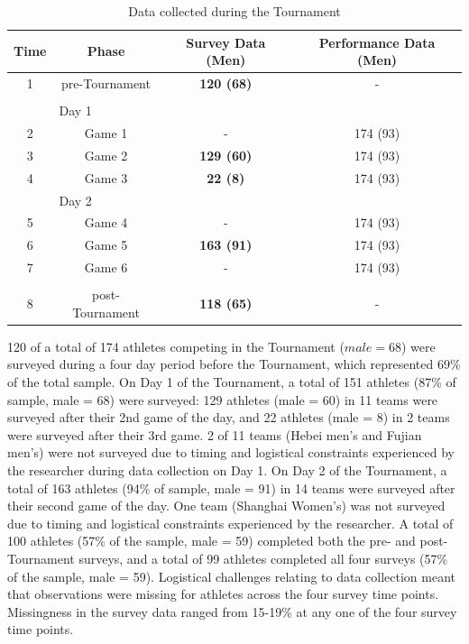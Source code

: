       \begin{table}[htbp]\caption{Data collected during the Tournament}
        \begin{center}
          \begin{small}
            \begin{tabular}{c|c c c}
                \bf Time & \bf Phase & \bf Survey Data (Men) & \bf Performance Data (Men) \\
                \hline
                1 & pre-Tournament & \bf 120 (68) & - \\
                & & & \\
                & \multicolumn{1}{l}{Day 1} & & \\
                2 & Game 1 & - & 174 (93) \\
                3 & Game 2 & \bf129 (60) & 174 (93) \\
                4 & Game 3 & \bf22 (8) & 174 (93) \\
                & \multicolumn{1}{l}{Day 2} & & \\
                5 & Game 4 & - & 174 (93) \\
                6 & Game 5 & \bf 163 (91) & 174 (93) \\
                7 & Game 6 & - & 174 (93) \\
                & & & \\
                8 & post-Tournament & \bf118 (65) & - \\
            \end{tabular}
          \end{small}
        \end{center}
        \label{tab:tournamentData}
      \end{table}

120 of a total of 174 athletes competing in the Tournament ($male = 68$) were surveyed during a four day period before the Tournament, which represented 69\% of the total sample. On Day 1 of the Tournament, a total of 151 athletes (87\% of sample, male = 68) were surveyed: 129 athletes (male = 60) in 11 teams were surveyed after their 2nd game of the day, and 22 athletes (male = 8) in 2 teams were surveyed after their 3rd game. 2 of 11 teams (Hebei men’s and Fujian men’s) were not surveyed due to timing and logistical constraints experienced by the researcher during data collection on Day 1. On Day 2 of the Tournament, a total of 163 athletes (94\% of sample, male = 91) in 14 teams were surveyed after their second game of the day. One team (Shanghai Women’s) was not surveyed due to timing and logistical constraints experienced by the researcher. A total of 100 athletes (57\% of the sample, male = 59) completed both the pre- and post-Tournament surveys, and a total of 99 athletes completed all four surveys (57\% of the sample, male = 59). Logistical challenges relating to data collection meant that observations were missing for athletes across the four survey time points. Missingness in the survey data ranged from 15-19\% at any one of the four survey time points.\\



